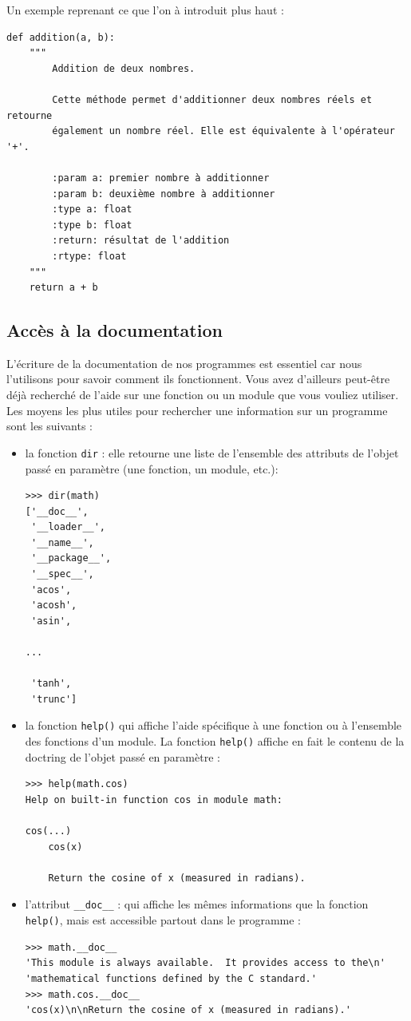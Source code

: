 \documentclass[12pt, a4paper]{article}
\begin{document}
Un exemple reprenant ce que l'on à introduit plus haut :
\begin{lstlisting}
def addition(a, b):
    """
        Addition de deux nombres.
				
        Cette méthode permet d'additionner deux nombres réels et retourne
        également un nombre réel. Elle est équivalente à l'opérateur '+'.
				
        :param a: premier nombre à additionner
        :param b: deuxième nombre à additionner
        :type a: float
        :type b: float
        :return: résultat de l'addition
        :rtype: float
    """
    return a + b
\end{lstlisting}


\subsection{Accès à la documentation}
L'écriture de la documentation de nos programmes est essentiel car nous l'utilisons pour savoir comment ils fonctionnent. Vous avez d'ailleurs peut-être déjà recherché de l'aide sur une fonction ou un module que vous vouliez utiliser. Les moyens les plus utiles pour rechercher une information sur un programme sont les suivants :
\begin{itemize}
	\item la fonction \lstinline{dir} : elle retourne une liste de l'ensemble des attributs de l'objet passé en paramètre (une fonction, un module, etc.):
	\begin{lstlisting}
>>> dir(math)
['__doc__',
 '__loader__',
 '__name__',
 '__package__',
 '__spec__',
 'acos',
 'acosh',
 'asin',

...

 'tanh',
 'trunc']
	\end{lstlisting}

	\item la fonction \lstinline{help()} qui affiche l'aide spécifique à une fonction ou à l'ensemble des fonctions d'un module. La fonction \lstinline{help()} affiche en fait le contenu de la doctring de l'objet passé en paramètre :
	\begin{lstlisting}
>>> help(math.cos)
Help on built-in function cos in module math:

cos(...)
    cos(x)
    
    Return the cosine of x (measured in radians).
	\end{lstlisting}

	\item l'attribut \lstinline{__doc__} : qui affiche les mêmes informations que la fonction \lstinline{help()}, mais est accessible partout dans le programme :
	\begin{lstlisting}
>>> math.__doc__
'This module is always available.  It provides access to the\n'
'mathematical functions defined by the C standard.'
>>> math.cos.__doc__
'cos(x)\n\nReturn the cosine of x (measured in radians).'
	\end{lstlisting}
	
\end{itemize}
\end{document}
